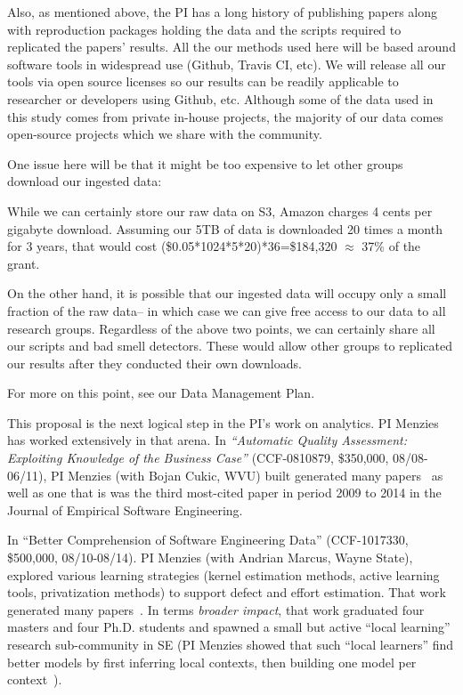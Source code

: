 Also, as mentioned above, the PI has a long history of publishing papers along with reproduction packages holding the data and the scripts required to
replicated the papers' results. All the our methods used here will be based around software tools in widespread   use (Github, Travis CI, etc).  We will release all our tools via open source licenses so our results can be readily applicable to researcher or developers using   Github, etc.
Although some of the data used in this study comes from private in-house projects,
the majority of our data comes open-source projects which we share with the community.

One issue here will be that it might be  too expensive
to let other groups download our  ingested data:
\bi
\item While we can certainly store our raw data on  S3,  Amazon   charges 4 cents per gigabyte download. Assuming our 5TB of data is downloaded 20 times a month for 3 years, that would cost (\$0.05*1024*5*20)*36=\$184,320 $\approx$ 37\% of the grant.
\item On the other hand, it is possible that our ingested data will occupy only a small fraction of the raw data-- in which case we can give free access
to our data to all
research groups.
\ei
Regardless of the above two points, we can certainly share all our scripts and bad smell detectors. These would allow other groups to replicated our results
after they conducted their own downloads.
 
 For more on this point, see our Data Management Plan.

 


This proposal is the next logical step in the PI's work on analytics.
{PI Menzies} has worked extensively in that arena.
In
\emph{``Automatic
Quality Assessment: Exploiting Knowledge of the Business Case''} (CCF-0810879, \$350,000, 08/08-06/11),
{PI Menzies} (with Bojan Cukic, WVU) built   generated many papers~\cite{jiang08a,me09n,me09i,me09b,me10d}
as well as one that is  was the third most-cited
paper in period 2009 to 2014 in the Journal of Empirical Software
Engineering.

In ``Better Comprehension of Software Engineering Data'' (CCF-1017330, \$500,000, 08/10-08/14).
{PI Menzies} (with Andrian Marcus, Wayne State),
explored various learning strategies (kernel estimation
methods, active learning tools, privatization methods) to
support defect and effort estimation. That work generated many papers~\cite{Bavota2010,Bavota2012a,Bavota2013,Bavota2012b,Haiduc2010a, Haiduc2013a, Haiduc2012a, Haiduc2013b, Marcus2010b, Ohlemacher2011b, Scanniello2013, Scanniello2011,me11m, peters12,Me13,me13a,peters12a}.
In terms \emph{broader impact}, that work graduated four masters and four Ph.D. students
and
spawned a small but active ``local learning'' research sub-community in SE (PI Menzies showed that
such ``local learners'' find better models
by first inferring local contexts, then building one model per context~\cite{Me13,me11m}).

